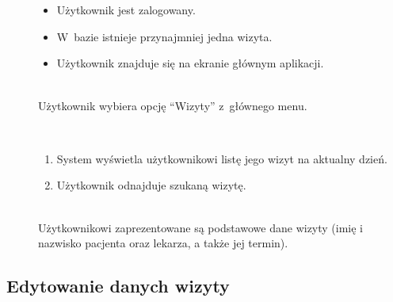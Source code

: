 \documentclass[11pt]{aghdpl}
\begin{document}
	\begin{description}
		\item[\useCaseAktor] \hfill \\
			\useCaseUzytkownik
		\item[\useCaseWarPocz] \hfill \\
		\begin{itemize}
			\item Użytkownik jest zalogowany.
			\item W~bazie istnieje przynajmniej jedna wizyta.
			\item Użytkownik znajduje się na ekranie głównym aplikacji.
		\end{itemize}
		\item[\useCaseZdarzInicj] \hfill \\
			Użytkownik wybiera opcję ``Wizyty'' z~głównego menu.
		\item[\useCaseScenBaz] \hfill \\ 
			\begin{enumerate}
			\item System wyświetla użytkownikowi listę jego wizyt na aktualny dzień.
			\item Użytkownik odnajduje szukaną wizytę.
			\end{enumerate}
		\item[\useCaseWarKonc] \hfill \\ 
			Użytkownikowi zaprezentowane są podstawowe dane wizyty (imię i nazwisko pacjenta oraz lekarza, a także jej termin).
	\end{description}

\subsection{Edytowanie danych wizyty}
\end{document}
